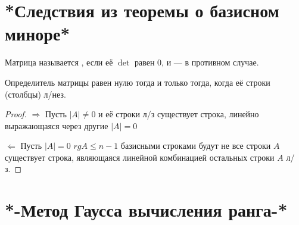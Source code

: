 \section{*Следствия из теоремы о базисном миноре*}
\begin{opred}
Матрица называется , если её $\det$ равен 0, и  --- в противном случае.
\end{opred}
\begin{theor}
Определитель матрицы равен нулю тогда и только тогда, когда её строки (столбцы) л/нез.
\end{theor}
\begin{proof}$\Longrightarrow$ Пусть $|A|\neq0$ и её строки л/з \then существует строка, линейно выражающаяся через другие \then $|A|=0$

$\Longleftarrow$ Пусть $|A|=0$ \then $rg A\leq n-1$ \then базисными строками будут не все строки $A$ \then существует строка, являющаяся линейной комбинацией остальных \then строки $A$ л/з.
\end{proof}
\section{*-Метод Гаусса вычисления ранга-*}
